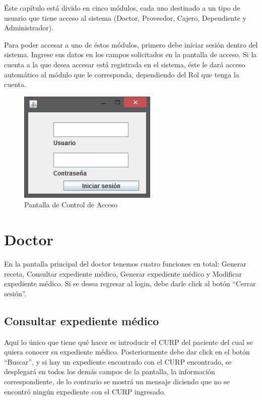 \'Este cap\'itulo est\'a divido en cinco m\'odulos, cada uno destinado a un tipo de usuario que tiene acceso al sistema (Doctor, Proveedor, Cajero, Dependiente y Administrador).


Para poder accesar a uno de \'estos m\'odulos, primero debe iniciar sesi\'on dentro del sistema. Ingrese sus datos en los campos solicitados en la pantalla de acceso. Si la cuenta a la que desea accesar est\'a registrada en el sistema, \'este le dar\'a acceso autom\'atico al m\'odulo que le corresponda, dependiendo del Rol que tenga la cuenta.

\begin{figure}[htbp!]
		\centering		
	\end{figure}
\begin{figure}[htbp!]
\centering
		\includegraphics[width=.4\textwidth]{images/gui/Login}
		\caption{Pantalla de Control de Acceso}
\end{figure}
\section{Doctor}
En la pantalla principal del doctor tenemos cuatro funciones en total: Generar receta, Consultar expediente m\'edico, Generar expediente m\'edico y Modificar expediente m\'edico. Si se desea regresar al login, debe darle click al bot\'on "`Cerrar sesi\'on"'.


\subsection{Consultar expediente m\'edico}
Aqu\'i lo \'unico que tiene qu\'e hacer es introducir el CURP del paciente del cual se quiera conocer su expediente m\'edico. Posteriormente debe dar click en el bot\'on "`Buscar"', y si hay un expediente encontrado con el CURP encontrado, se desplegar\'a en todos los dem\'as campos de la pantalla, la informaci\'on correspondiente, de lo contrario se mostr\'a un mensaje diciendo que no se encontr\'o ning\'un expediente con el CURP ingresado.

